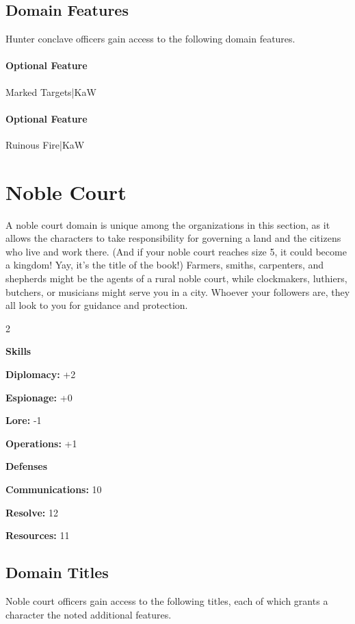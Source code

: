 \documentclass[10pt,a4paper,twoside,bg=print,twocolumn,openany,nodeprecatedcode]{dndbook}
\begin{document}
\subsection{Domain Features}
Hunter conclave officers gain access to the following domain features.

\paragraph{Optional Feature}
Marked Targets|KaW

\paragraph{Optional Feature}
Ruinous Fire|KaW

\section{Noble Court}
A noble court domain is unique among the organizations in this section, as it allows the characters to take responsibility for governing a land and the citizens who live and work there. (And if your noble court reaches size 5, it could become a kingdom! Yay, it's the title of the book!) Farmers, smiths, carpenters, and shepherds might be the agents of a rural noble court, while clockmakers, luthiers, butchers, or musicians might serve you in a city. Whoever your followers are, they all look to you for guidance and protection.


\begin{itemize}
\begin{multicols}{2}
\item \textbf{Skills}
\item \textbf{Diplomacy:} +2
\item \textbf{Espionage:} +0
\item \textbf{Lore:} -1
\item \textbf{Operations:} +1
\item \textbf{Defenses}
\item \textbf{Communications:} 10
\item \textbf{Resolve:} 12
\item \textbf{Resources:} 11
\end{multicols}

\end{itemize}

\subsection{Domain Titles}
Noble court officers gain access to the following titles, each of which grants a character the noted additional features.
\end{document}
